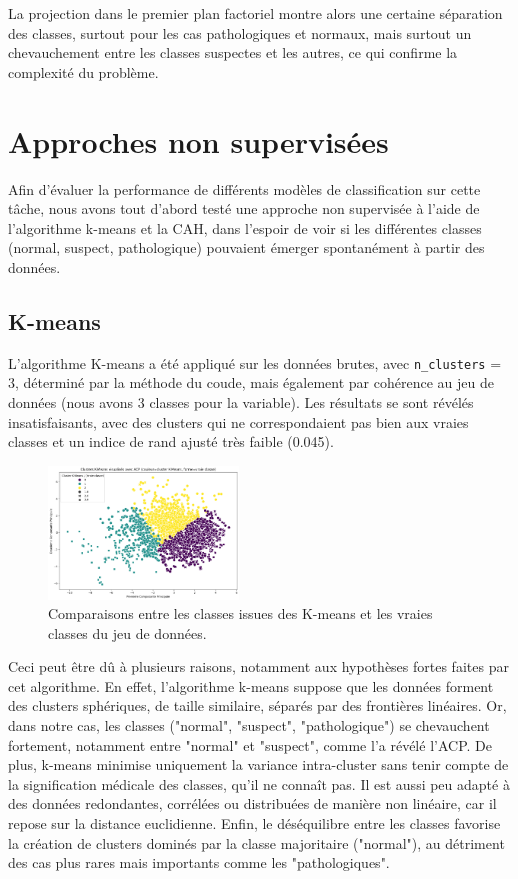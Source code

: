 \documentclass[twocolumn,10pt]{article}
\begin{document}
La projection dans le premier plan factoriel montre alors une certaine séparation des classes, surtout pour les cas pathologiques et normaux, mais surtout un chevauchement entre les classes suspectes et les autres, ce qui confirme la complexité du problème.



\section{Approches non supervisées}\label{sec:non_sup}

Afin d'évaluer la performance de différents modèles de classification sur cette tâche, nous avons tout d'abord testé une approche non supervisée à l'aide de l'algorithme k-means et la CAH, dans l'espoir de voir si les différentes classes (normal, suspect, pathologique) pouvaient émerger spontanément à partir des données.

\subsection{K-means}\label{subsec:non_sup:kmeans}

L'algorithme K-means a été appliqué sur les données brutes, avec \texttt{n\_clusters} = 3, déterminé par la méthode du coude, mais également par cohérence au jeu de données (nous avons 3 classes pour la variable). Les résultats se sont révélés insatisfaisants, avec des clusters qui ne correspondaient pas bien aux vraies classes et un indice de rand ajusté très faible (0.045). 
\begin{figure}[H]
    \centering
    \includegraphics[width=0.45\textwidth]{projet/K_means_donnes_brutes.png}
    \caption{Comparaisons entre les classes issues des K-means et les vraies classes du jeu de données.}
    \label{fig:k_means}
\end{figure}
Ceci peut être dû à plusieurs raisons, notamment aux hypothèses fortes faites par cet algorithme. En effet, l’algorithme k-means suppose que les données forment des clusters sphériques, de taille similaire, séparés par des frontières linéaires. Or, dans notre cas, les classes ("normal", "suspect", "pathologique") se chevauchent fortement, notamment entre "normal" et "suspect", comme l’a révélé l’ACP. De plus, k-means minimise uniquement la variance intra-cluster sans tenir compte de la signification médicale des classes, qu’il ne connaît pas. Il est aussi peu adapté à des données redondantes, corrélées ou distribuées de manière non linéaire, car il repose sur la distance euclidienne. Enfin, le déséquilibre entre les classes favorise la création de clusters dominés par la classe majoritaire ("normal"), au détriment des cas plus rares mais importants comme les "pathologiques".
\end{document}
